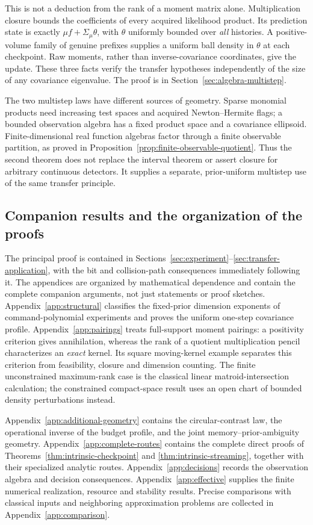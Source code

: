 This is not a deduction from the rank of a moment matrix alone.
Multiplication closure bounds the coefficients of every acquired
likelihood product. Its prediction state is exactly
$\mu f+\Sigma_\mu\theta$, with $\theta$ uniformly bounded over
\emph{all} histories. A positive-volume family of genuine prefixes
supplies a uniform ball density in $\theta$ at each checkpoint.
Raw moments, rather than inverse-covariance coordinates, give the
update. These three facts verify the transfer hypotheses independently
of the size of any covariance eigenvalue. The proof is in
Section~\ref{sec:algebra-multistep}.

The two multistep laws have different sources of geometry. Sparse
monomial products need increasing test spaces and acquired
Newton--Hermite flags; a bounded observation algebra has a fixed
product space and a covariance ellipsoid. Finite-dimensional real
function algebras factor through a finite observable partition, as
proved in Proposition~\ref{prop:finite-observable-quotient}. Thus the
second theorem does not replace the interval theorem or assert closure
for arbitrary continuous detectors. It supplies a separate,
prior-uniform multistep use of the same transfer principle.

\subsection{Companion results and the organization of the proofs}
The principal proof is contained in Sections~\ref{sec:experiment}--\ref{sec:transfer-application},
with the bit and collision-path consequences immediately following it.
The appendices are organized by mathematical dependence and contain the
complete companion arguments, not just statements or proof sketches.
Appendix~\ref{app:structural} classifies the fixed-prior dimension
exponents of command-polynomial experiments and proves the uniform
one-step covariance profile. Appendix~\ref{app:pairings} treats
full-support moment pairings: a positivity criterion gives annihilation,
whereas the rank of a quotient multiplication pencil characterizes an
\emph{exact} kernel. Its square moving-kernel example separates this
criterion from feasibility, closure and dimension counting. The finite
unconstrained maximum-rank case is the classical linear
matroid-intersection calculation; the constrained compact-space result
uses an open chart of bounded density perturbations instead.

Appendix~\ref{app:additional-geometry} contains the circular-contrast
law, the operational inverse of the budget profile, and the joint
memory--prior-ambiguity geometry. Appendix~\ref{app:complete-routes}
contains the complete direct proofs of
Theorems~\ref{thm:intrinsic-checkpoint} and
\ref{thm:intrinsic-streaming}, together with their specialized analytic routes.
Appendix~\ref{app:decisions} records the observation algebra and decision
consequences. Appendix~\ref{app:effective} supplies the finite numerical
realization, resource and stability results. Precise comparisons with
classical inputs and neighboring approximation problems are collected
in Appendix~\ref{app:comparison}.

